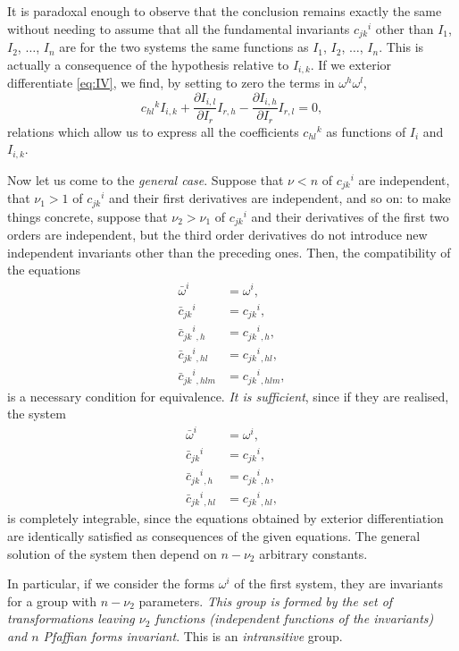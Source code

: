 \documentclass[leqno,11pt]{article}
\newcommand{\pd}{\partial}
\theoremstyle{shape1}
\theoremstyle{shape0}
\theoremstyle{shape2}
\theoremstyle{definition}
\begin{document}
It is paradoxal enough to observe that the conclusion remains exactly the same without needing to assume that all the fundamental invariants $c_{jk}{}^{i}$ other than $I_{1}$, $I_{2}$, $\dots$, $I_{n}$ are for the two systems the same functions as $I_{1}$, $I_{2}$, $\dots$, $I_{n}$. This is actually a consequence of the hypothesis relative to $I_{i,k}$. If we exterior differentiate \eqref{eq:IV}, we find, by setting to zero the terms in $\omega^{h}\omega^{l}$,
\[
c_{hl}{}^{k}I_{i,k}+\frac{\pd I_{i,l}}{\pd I_{r}}I_{r,h}-\frac{\pd I_{i,h}}{\pd I_{r}}I_{r,l}=0,
\]
relations which allow us to express all the coefficients $c_{hl}{}^{k}$ as functions of $I_{i}$ and $I_{i,k}$.

Now let us come to the \emph{general case}. Suppose that $\nu<n$ of $c_{jk}{}^{i}$ are independent, that $\nu_{1}>1$ of $c_{jk}{}^{i}$ and their first derivatives are independent, and so on: to make things concrete, suppose that $\nu_{2}>\nu_{1}$ of $c_{jk}{}^{i}$ and their derivatives of the first two orders are independent, but the third order derivatives do not introduce new independent invariants other than the preceding ones. Then, the compatibility of the equations
\begin{align*}
  \bar\omega^{i}&=\omega^{i},\\
  \bar c_{jk}{}^{i}&=c_{jk}{}^{i},\\
  \bar c_{jk}{}^{i}{}_{,h}&=c_{jk}{}^{i}{}_{,h},\\
  \bar c_{jk}{}^{i}{}_{,hl}&=c_{jk}{}^{i}{}_{,hl},\\
  \bar c_{jk}{}^{i}{}_{,hlm}&=c_{jk}{}^{i}{}_{,hlm},
\end{align*}
is a necessary condition for equivalence. \emph{It is sufficient}, since if they are realised, the system
\begin{align*}
  \bar\omega^{i}&=\omega^{i},\\
  \bar c_{jk}{}^{i}&=c_{jk}{}^{i},\\
  \bar c_{jk}{}^{i}{}_{,h}&=c_{jk}{}^{i}{}_{,h},\\
  \bar c_{jk}{}^{i}{}_{,hl}&=c_{jk}{}^{i}{}_{,hl},
\end{align*}
is completely integrable, since the equations obtained by exterior differentiation are identically satisfied as consequences of the given equations. The general solution of the system then depend on $n-\nu_{2}$ arbitrary constants.

In particular, if we consider the forms $\omega^{i}$ of the first system, they are invariants for a group with $n-\nu_{2}$ parameters. \emph{This group is formed by the set of transformations leaving $\nu_{2}$ functions (independent functions of the invariants) and $n$ Pfaffian forms invariant}. This is an \emph{intransitive} group.
\end{document}
